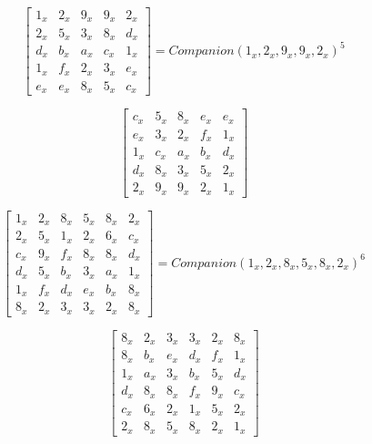 \begin{equation}\label{mat:photon_a100}
  \begin{bmatrix}
  1_x & 2_x & 9_x & 9_x & 2_x\\
  2_x & 5_x & 3_x & 8_x & d_x\\
  d_x & b_x & a_x & c_x & 1_x\\
  1_x & f_x & 2_x & 3_x & e_x\\
  e_x & e_x & 8_x & 5_x & c_x
  \end{bmatrix}
  =
  Companion(1_x,2_x,9_x,9_x,2_x)^5
\end{equation}

\begin{equation}\label{mat:photon_a100-inv}
  \begin{bmatrix}
  c_x & 5_x & 8_x & e_x & e_x\\
  e_x & 3_x & 2_x & f_x & 1_x\\
  1_x & c_x & a_x & b_x & d_x\\
  d_x & 8_x & 3_x & 5_x & 2_x\\
  2_x & 9_x & 9_x & 2_x & 1_x
  \end{bmatrix}
\end{equation}

\begin{equation}\label{mat:photon_a144}
  \begin{bmatrix}
  1_x & 2_x & 8_x & 5_x & 8_x & 2_x\\
  2_x & 5_x & 1_x & 2_x & 6_x & c_x\\
  c_x & 9_x & f_x & 8_x & 8_x & d_x\\
  d_x & 5_x & b_x & 3_x & a_x & 1_x\\
  1_x & f_x & d_x & e_x & b_x & 8_x\\
  8_x & 2_x & 3_x & 3_x & 2_x & 8_x
  \end{bmatrix}
  =
  Companion(1_x,2_x,8_x,5_x,8_x,2_x)^6
\end{equation}

\begin{equation}\label{mat:photon_a144-inv}
  \begin{bmatrix}
  8_x & 2_x & 3_x & 3_x & 2_x & 8_x\\
  8_x & b_x & e_x & d_x & f_x & 1_x\\
  1_x & a_x & 3_x & b_x & 5_x & d_x\\
  d_x & 8_x & 8_x & f_x & 9_x & c_x\\
  c_x & 6_x & 2_x & 1_x & 5_x & 2_x\\
  2_x & 8_x & 5_x & 8_x & 2_x & 1_x
  \end{bmatrix}
\end{equation}

